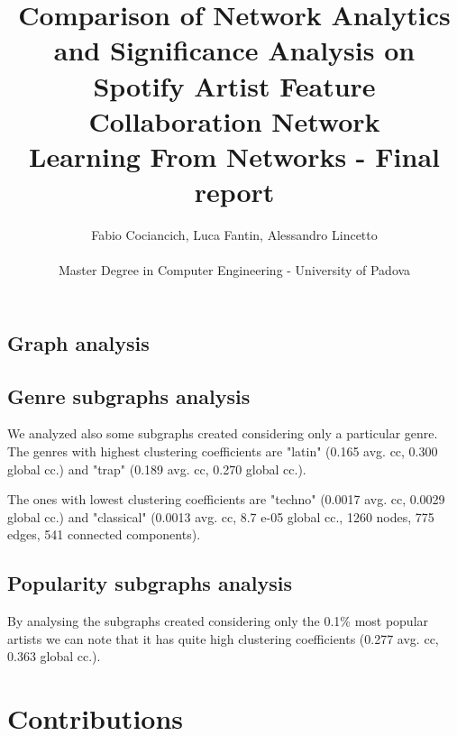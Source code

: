 \documentclass[a4paper, 12pt, conference]{ieeeconf}      %
\title{Comparison of Network Analytics and Significance Analysis on Spotify Artist Feature Collaboration Network\\
\large Learning From Networks - Final report \\}
\author{Fabio Cociancich, Luca Fantin, Alessandro Lincetto %
\\\\ Master Degree in Computer Engineering - University of Padova \\
}
\begin{document}
\maketitle
\thispagestyle{plain}
\pagestyle{plain}





















\subsection{Graph analysis}

\subsection{Genre subgraphs analysis}
We analyzed also some subgraphs created considering only a particular genre.
The genres with highest clustering coefficients are "latin" (0.165 avg. cc,  0.300 global cc.) 
and "trap" (0.189 avg. cc,  0.270 global cc.).

The ones with lowest clustering coefficients are "techno" (0.0017 avg. cc,  0.0029 global cc.)  
and "classical" (0.0013 avg. cc,  8.7 e-05 global cc., 1260 nodes, 775 edges, 541 
connected components).


\subsection{Popularity subgraphs analysis}



By analysing the subgraphs created considering only the 0.1\% most popular artists we can 
note that it has quite high clustering coefficients (0.277 avg. cc,  0.363 global cc.).





\section*{Contributions}

\printbibliography[nottype=online]
\end{document}
